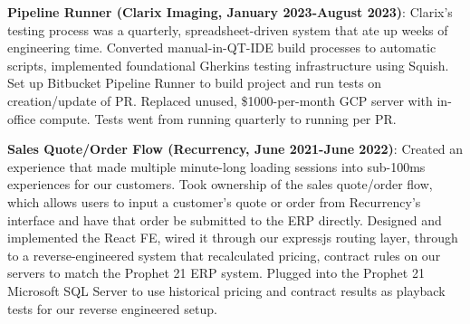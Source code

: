 \documentclass{res}
\begin{document}
\begin{resume}
    {\bf Pipeline Runner (Clarix Imaging, January 2023-August 2023)}:
    Clarix's testing process was a quarterly, spreadsheet-driven system that ate
    up weeks of engineering time. Converted manual-in-QT-IDE build processes to
    automatic scripts, implemented foundational Gherkins testing infrastructure
    using Squish. Set up Bitbucket Pipeline Runner to build project and run
    tests on creation/update of PR. Replaced unused, \$1000-per-month GCP server
    with in-office compute. Tests went from running quarterly to running per PR.

    {\bf Sales Quote/Order Flow (Recurrency, June 2021-June 2022)}:
    Created an experience that made multiple minute-long loading sessions into
    sub-100ms experiences for our customers. Took ownership of the sales
    quote/order flow, which allows users to input a customer's quote or order
    from Recurrency's interface and have that order be submitted to the ERP
    directly. Designed and implemented the React FE, wired it through our
    expressjs routing layer, through to a reverse-engineered system that
    recalculated pricing, contract rules on our servers to match the Prophet 21
    ERP system. Plugged into the Prophet 21 Microsoft SQL Server to use
    historical pricing and contract results as playback tests for our reverse
    engineered setup.
  

\end{resume}
\end{document}
